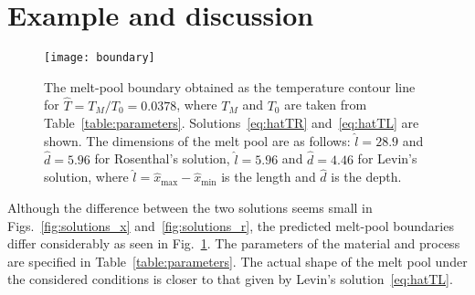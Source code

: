 \documentclass{article}
\begin{document}
\section{Example and discussion}

\begin{figure}
    \centering
    \texttt{[image: boundary]}
    \caption{
        The melt-pool boundary obtained as the temperature contour line for $\hat{T}=T_M/T_0=0.0378$,
        where $T_M$ and $T_0$ are taken from Table~\ref{table:parameters}.
        Solutions~\eqref{eq:hatTR} and~\eqref{eq:hatTL} are shown.
        The dimensions of the melt pool are as follows:
        $\hat{l} = 28.9$ and $\hat{d} = 5.96$ for Rosenthal's solution,
        $\hat{l} = 5.96$ and $\hat{d} = 4.46$ for Levin's solution,
        where $\hat{l} = \hat{x}_\text{max} - \hat{x}_\text{min}$ is the length and $\hat{d}$ is the depth.
    }\label{fig:boundary}
\end{figure}

Although the difference between the two solutions seems small
in Figs.~\ref{fig:solutions_x} and~\ref{fig:solutions_r},
the predicted melt-pool boundaries differ considerably as seen in Fig.~\ref{fig:boundary}.
The parameters of the material and process are specified in Table~\ref{table:parameters}.
The actual shape of the melt pool under the considered conditions is closer to that
given by Levin's solution~\eqref{eq:hatTL}.
\end{document}

